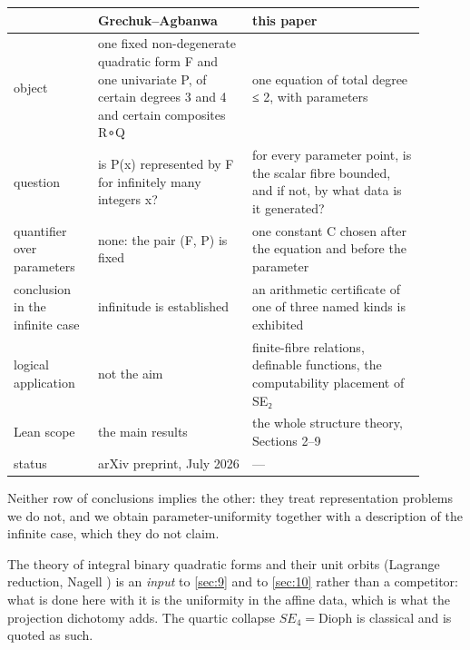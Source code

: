 \documentclass[11pt]{article}
\theoremstyle{plain}
\theoremstyle{definition}
\theoremstyle{remark}
\theoremstyle{plain}
\theoremstyle{definition}
\theoremstyle{remark}
\theoremstyle{plain}
\theoremstyle{definition}
\theoremstyle{remark}
\begin{document}
\begin{longtable}{@{}>{\raggedright\arraybackslash}p{0.187\linewidth}>{\raggedright\arraybackslash}p{0.338\linewidth}>{\raggedright\arraybackslash}p{0.375\linewidth}@{}}
\toprule
 & Grechuk–Agbanwa \cite{GA26} & this paper \\
\midrule\endhead
object & one fixed non-degenerate quadratic form F and one univariate P, of certain degrees 3 and 4 and certain composites R∘Q & one equation of total degree ≤ 2, with parameters \\
question & is P(x) represented by F for infinitely many integers x? & for every parameter point, is the scalar fibre bounded, and if not, by what data is it generated? \\
quantifier over parameters & none: the pair (F, P) is fixed & one constant C chosen after the equation and before the parameter \\
conclusion in the infinite case & infinitude is established & an arithmetic certificate of one of three named kinds is exhibited \\
logical application & not the aim & finite-fibre relations, definable functions, the computability placement of SE₂ \\
Lean scope & the main results & the whole structure theory, Sections 2–9 \\
status & ar\allowbreak{}Xiv preprint, July 2026 & — \\
\bottomrule
\end{longtable}
Neither row of conclusions implies the other: they treat representation problems we do not, and we obtain parameter-uniformity together with a description of the infinite case, which they do not claim.

The theory of integral binary quadratic forms and their unit orbits (Lagrange reduction, Nagell \cite{Nag}) is an \emph{input} to \cref{sec:9} and to \cref{sec:10} rather than a competitor: what is done here with it is the uniformity in the affine data, which is what the projection dichotomy adds. The quartic collapse $SE_{4} = \mathrm{Dioph}$ is classical and is quoted as such.
\end{document}
